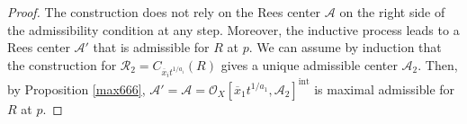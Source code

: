 \documentclass{amsart}
\newcommand{\cA}{{\mathcal A}}
\newcommand{\cO}{{\mathcal O}}
\renewcommand{\cR}{{\mathcal R}}
\newcommand{\ord}{{\operatorname{ord}}}
\newcommand{\inte}{{\operatorname{int}}}
\begin{document}
\begin{proof}

The construction does not rely on the Rees center $\cA$ on the right side of the admissibility condition at any step. Moreover, the inductive process leads to a Rees center $\cA'$ that is admissible for $R$ at $p$. 
We can assume by induction that  the construction for $\cR_2=C_{\overline{x}_{i}t^{1/a_i}}(R)$ gives a unique admissible center $\cA_2$. Then, by Proposition \ref{max666},  $\cA'=\cA=\cO_X[\overline{x}_{1}t^{1/a_1},\cA_2]^\inte$ is maximal admissible for $R$ at $p$.



\end{proof}
\end{document}
